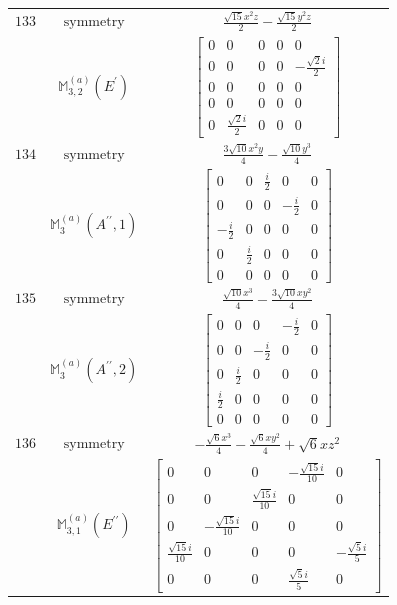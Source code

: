 \documentclass[fleqn,8pt,landscape]{jsarticle}
\begin{document}
\begin{longtable}{ccc}
$ 133 $ & $ \text{symmetry} $ & $ \frac{\sqrt{15} x^{2} z}{2} - \frac{\sqrt{15} y^{2} z}{2} $ \\
$  $ & $ \mathbb{M}_{3,2}^{(a)}(E^{\prime}) $ & $ \begin{bmatrix} 0 & 0 & 0 & 0 & 0 \\ 0 & 0 & 0 & 0 & - \frac{\sqrt{2} i}{2} \\ 0 & 0 & 0 & 0 & 0 \\ 0 & 0 & 0 & 0 & 0 \\ 0 & \frac{\sqrt{2} i}{2} & 0 & 0 & 0 \end{bmatrix} $ \\ \hline
$ 134 $ & $ \text{symmetry} $ & $ \frac{3 \sqrt{10} x^{2} y}{4} - \frac{\sqrt{10} y^{3}}{4} $ \\
$  $ & $ \mathbb{M}_{3}^{(a)}(A^{\prime\prime},1) $ & $ \begin{bmatrix} 0 & 0 & \frac{i}{2} & 0 & 0 \\ 0 & 0 & 0 & - \frac{i}{2} & 0 \\ - \frac{i}{2} & 0 & 0 & 0 & 0 \\ 0 & \frac{i}{2} & 0 & 0 & 0 \\ 0 & 0 & 0 & 0 & 0 \end{bmatrix} $ \\ \hline
$ 135 $ & $ \text{symmetry} $ & $ \frac{\sqrt{10} x^{3}}{4} - \frac{3 \sqrt{10} x y^{2}}{4} $ \\
$  $ & $ \mathbb{M}_{3}^{(a)}(A^{\prime\prime},2) $ & $ \begin{bmatrix} 0 & 0 & 0 & - \frac{i}{2} & 0 \\ 0 & 0 & - \frac{i}{2} & 0 & 0 \\ 0 & \frac{i}{2} & 0 & 0 & 0 \\ \frac{i}{2} & 0 & 0 & 0 & 0 \\ 0 & 0 & 0 & 0 & 0 \end{bmatrix} $ \\ \hline
$ 136 $ & $ \text{symmetry} $ & $ - \frac{\sqrt{6} x^{3}}{4} - \frac{\sqrt{6} x y^{2}}{4} + \sqrt{6} x z^{2} $ \\
$  $ & $ \mathbb{M}_{3,1}^{(a)}(E^{\prime\prime}) $ & $ \begin{bmatrix} 0 & 0 & 0 & - \frac{\sqrt{15} i}{10} & 0 \\ 0 & 0 & \frac{\sqrt{15} i}{10} & 0 & 0 \\ 0 & - \frac{\sqrt{15} i}{10} & 0 & 0 & 0 \\ \frac{\sqrt{15} i}{10} & 0 & 0 & 0 & - \frac{\sqrt{5} i}{5} \\ 0 & 0 & 0 & \frac{\sqrt{5} i}{5} & 0 \end{bmatrix} $ \\ \hline

\end{longtable}
\end{document}
